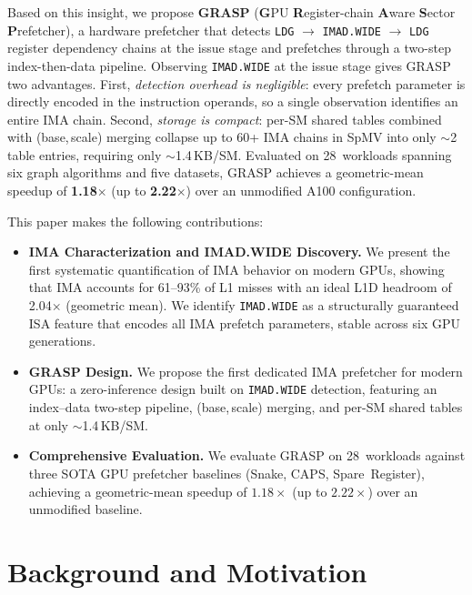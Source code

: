 \documentclass[sigconf, screen, review]{acmart}
\begin{document}
Based on this insight, we propose \textbf{GRASP} (\textbf{G}PU
\textbf{R}egister-chain \textbf{A}ware \textbf{S}ector
\textbf{P}refetcher), a hardware prefetcher that detects
\texttt{LDG} $\to$ \texttt{IMAD.WIDE} $\to$ \texttt{LDG} register
dependency chains at
the issue stage and prefetches through a two-step
index-then-data pipeline.
Observing \texttt{IMAD.WIDE} at the issue stage gives GRASP two
advantages.
First, \emph{detection overhead is negligible}: every prefetch
parameter is directly encoded in the instruction operands, so a
single observation identifies an entire IMA chain.
Second, \emph{storage is compact}: per-SM shared tables combined
with (base,\,scale) merging collapse up to 60+ IMA chains in SpMV
into only $\sim$2 table entries, requiring only $\sim$1.4\,KB/SM.
Evaluated on 28~workloads spanning six graph algorithms and five
datasets, GRASP achieves a geometric-mean speedup of
\textbf{1.18$\times$} (up to \textbf{2.22$\times$}) over an
unmodified A100 configuration.

\smallskip\noindent
This paper makes the following contributions:
\begin{itemize}[leftmargin=*, nosep]
\item \textbf{IMA Characterization and IMAD.WIDE Discovery.}
  We present the first systematic quantification of IMA behavior on
  modern GPUs, showing that IMA accounts for 61--93\% of L1 misses
  with an ideal L1D headroom of 2.04$\times$ (geometric mean).
  We identify \texttt{IMAD.WIDE} as a structurally guaranteed ISA
  feature that encodes all IMA prefetch parameters, stable across
  six GPU generations.
\item \textbf{GRASP Design.}
  We propose the first dedicated IMA prefetcher for modern GPUs:
  a zero-inference design built on \texttt{IMAD.WIDE} detection,
  featuring an index--data two-step pipeline, (base,\,scale)
  merging, and per-SM shared tables at only $\sim$1.4\,KB/SM.
\item \textbf{Comprehensive Evaluation.}
  We evaluate GRASP on 28~workloads against three SOTA GPU
  prefetcher baselines (Snake, CAPS, Spare~Register),
  achieving a geometric-mean speedup of $1.18\times$
  (up to $2.22\times$) over an unmodified baseline.
\end{itemize}

\section{Background and Motivation}
\label{sec:motivation}
\end{document}
